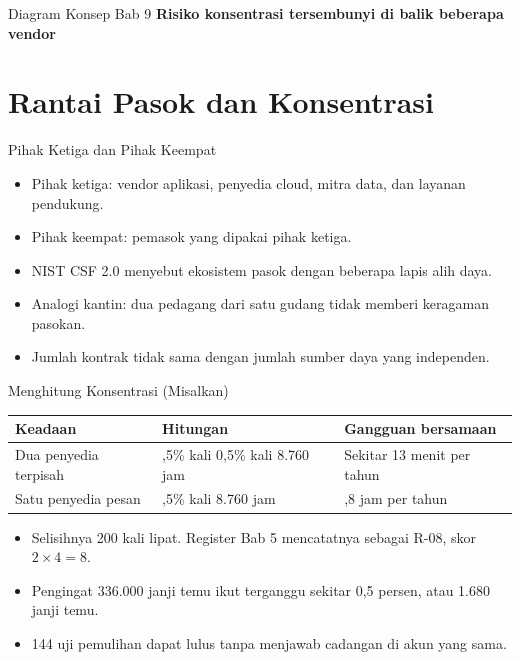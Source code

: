 \documentclass[aspectratio=169, table, 12pt]{beamer}
\begin{document}
\begin{frame}{{\Large Diagram Konsep Bab 9}}
  \centering
  {\small\bfseries Risiko konsentrasi tersembunyi di balik beberapa vendor}\par\medskip
  \label{fig:session09-ilustrasi-bab}
\end{frame}

\section{Rantai Pasok dan Konsentrasi}

\begin{frame}{{\Large Pihak Ketiga dan Pihak Keempat}}
  \vspace{6pt}
  \small
  \begin{itemize}
    \item Pihak ketiga: vendor aplikasi, penyedia cloud, mitra data, dan layanan pendukung.
    \item Pihak keempat: pemasok yang dipakai pihak ketiga.
    \item NIST CSF 2.0 menyebut ekosistem pasok dengan beberapa lapis alih daya.
    \item Analogi kantin: dua pedagang dari satu gudang tidak memberi keragaman pasokan.
    \item Jumlah kontrak tidak sama dengan jumlah sumber daya yang independen.
  \end{itemize}
\end{frame}

\begin{frame}{{\Large Menghitung Konsentrasi (Misalkan)}}
  \vspace{4pt}
  \small
  \begin{tabularx}{\textwidth}{|>{\raggedright\arraybackslash}X|>{\raggedright\arraybackslash}p{}|>{\raggedright\arraybackslash}p{}|}
    \hline
    \textbf{Keadaan} & \textbf{Hitungan} & \textbf{Gangguan bersamaan} \\ \hline
    Dua penyedia terpisah & 0,5\% kali 0,5\% kali 8.760 jam & Sekitar 13 menit per tahun \\ \hline
    Satu penyedia pesan & 0,5\% kali 8.760 jam & 43,8 jam per tahun \\ \hline
  \end{tabularx}

  \vspace{8pt}
  \begin{itemize}
    \item Selisihnya 200 kali lipat. Register Bab 5 mencatatnya sebagai R-08, skor $2 \times 4 = 8$.
    \item Pengingat 336.000 janji temu ikut terganggu sekitar 0,5 persen, atau 1.680 janji temu.
    \item 144 uji pemulihan dapat lulus tanpa menjawab cadangan di akun yang sama.
  \end{itemize}
\end{frame}
\end{document}
